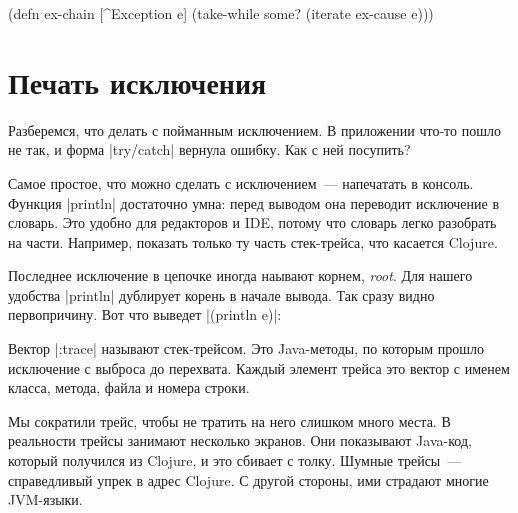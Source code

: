 \begin{english}
  \begin{clojure}
(defn ex-chain [^Exception e]
  (take-while some? (iterate ex-cause e)))
  \end{clojure}
\end{english}

\section{Печать исключения}

Разберемся, что делать с пойманным исключением. В приложении что-то пошло не
так, и форма \spverb|try/catch| вернула ошибку. Как с ней посупить?

Самое простое, что можно сделать с исключением~--- напечатать в консоль. Функция
\spverb|println| достаточно умна: перед выводом она переводит исключение в
словарь. Это удобно для редакторов и IDE, потому что словарь легко разобрать на
части. Например, показать только ту часть стек-трейса, что касается Clojure.

Последнее исключение в цепочке иногда наывают корнем, \emph{root}. Для нашего
удобства \spverb|println| дублирует корень в начале вывода. Так сразу видно
первопричину. Вот что выведет \spverb|(println e)|:

\begin{english}
\end{english}

Вектор \spverb|:trace| называют стек-трейсом. Это Java-методы, по которым прошло
исключение с выброса до перехвата. Каждый элемент трейса это вектор с именем
класса, метода, файла и номера строки.

Мы сократили трейс, чтобы не тратить на него слишком много места. В реальности
трейсы занимают несколько экранов. Они показывают Java-код, который получился из
Clojure, и это сбивает с толку. Шумные трейсы~--- справедливый упрек в адрес
Clojure. С другой стороны, ими страдают многие JVM-языки.

